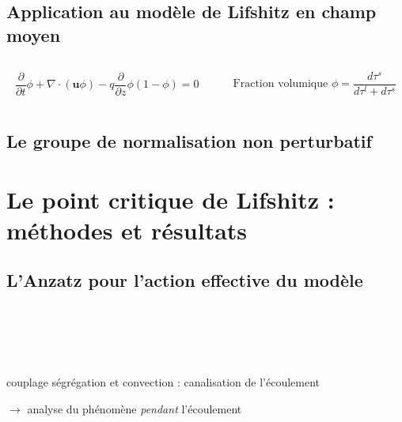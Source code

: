 \documentclass[xcolor=dvipsnames]{beamer}
\newcommand{\p}[2]{\ensuremath{\frac{\partial {#1}}{\partial {#2}}}}
\begin{document}
\begin{frame}
\end{frame}

\subsection{Application au modèle de Lifshitz en champ moyen}
\begin{frame}

\begin{columns}

\begin{column}{6cm}
\[
	\p{}{t} \phi + \nabla \cdot ( \mathbf{u} \phi )  - q \p{}{z} \phi( 1 - \phi) = 0
\]
\end{column}

\begin{column}{6cm}
\[
 \text{Fraction volumique } \phi = \frac{d\tau^s}{d\tau^l + d\tau^s} 
\]
\end{column}

\end{columns}

\end{frame}

\subsection{Le groupe de normalisation non perturbatif}

\section{Le point critique de Lifshitz : méthodes et résultats}
\subsection{L'Anzatz pour l'action effective du modèle}
\begin{frame}

\begin{columns}

\begin{column}{6cm}

\end{column}

\begin{column}{6cm}

\end{column}

\end{columns}

~ \\
~ \\
~ \\
\begin{centering}
couplage ségrégation et convection : canalisation de l'écoulement 
\end{centering}

\begin{centering}
$\rightarrow$ analyse du phénomène \textit{pendant} l'écoulement
\end{centering}
\end{frame}
\end{document}
